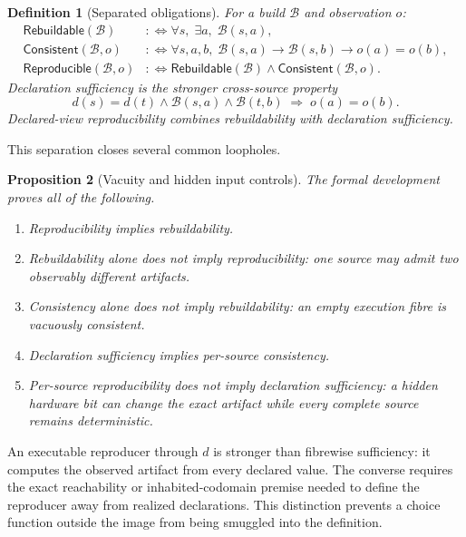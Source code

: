 \documentclass[11pt]{article}
\newtheorem{definition}{Definition}[section]
\newtheorem{proposition}[definition]{Proposition}
\newcommand{\Build}{\mathcal{B}}
\begin{document}
\begin{definition}[Separated obligations]
For a build $\Build$ and observation $o$:
\begin{align*}
\mathsf{Rebuildable}(\Build)
  &:\!\Longleftrightarrow \forall s,\; \exists a,\; \Build(s,a),\\
\mathsf{Consistent}(\Build,o)
  &:\!\Longleftrightarrow
    \forall s,a,b,\;\Build(s,a)\to\Build(s,b)\to o(a)=o(b),\\
\mathsf{Reproducible}(\Build,o)
  &:\!\Longleftrightarrow
    \mathsf{Rebuildable}(\Build)\wedge\mathsf{Consistent}(\Build,o).
\end{align*}
Declaration sufficiency is the stronger cross-source property
\[
  d(s)=d(t) \wedge \Build(s,a) \wedge \Build(t,b)
  \;\Longrightarrow\; o(a)=o(b).
\]
Declared-view reproducibility combines rebuildability with declaration
sufficiency.
\end{definition}

This separation closes several common loopholes.

\begin{proposition}[Vacuity and hidden input controls]
The formal development proves all of the following.
\begin{enumerate}
  \item Reproducibility implies rebuildability.
  \item Rebuildability alone does not imply reproducibility: one source may
        admit two observably different artifacts.
  \item Consistency alone does not imply rebuildability: an empty execution
        fibre is vacuously consistent.
  \item Declaration sufficiency implies per-source consistency.
  \item Per-source reproducibility does not imply declaration sufficiency: a
        hidden hardware bit can change the exact artifact while every complete
        source remains deterministic.
\end{enumerate}
\end{proposition}

An executable reproducer through $d$ is stronger than fibrewise sufficiency:
it computes the observed artifact from every declared value.  The converse
requires the exact reachability or inhabited-codomain premise needed to define
the reproducer away from realized declarations.  This distinction prevents a
choice function outside the image from being smuggled into the definition.
\end{document}
